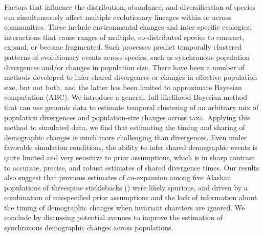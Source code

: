 Factors that influence the distribution, abundance, and
diversification of species can simultaneously affect multiple evolutionary
lineages within or across communities.
These include environmental changes and inter-specific ecological interactions
that cause ranges of multiple, co-distributed species to contract,
expand, or become fragmented.
Such processes predict temporally clustered patterns of evolutionary events
across species, such as synchronous population divergences and/or changes in
population size.
There have been a number of methods developed to infer shared divergences or
changes in effective population size, but not both, and the latter has been
limited to approximate Bayesian computation (ABC).
We introduce a general, full-likelihood Bayesian method that can use genomic
data to estimate temporal clustering of an arbitrary mix of population
divergences and population-size changes across taxa.
Applying this method to simulated data,
we find that estimating the timing and sharing of demographic changes is much
more challenging than divergences.
Even under favorable simulation conditions, the ability to infer shared
demographic events is quite limited and very sensitive to prior assumptions,
which is in sharp contrast to accurate, precise, and robust estimates of shared
divergence times.
Our results also suggest that previous estimates of co-expansion among five
Alaskan populations of threespine sticklebacks ()
were likely spurious, and driven by a combination of misspecified prior
assumptions and the lack of information about the timing of demographic changes
when invariant charcters are ignored.
We conclude by discussing potential avenues to improve the estimation of
synchronous demographic changes across populations.

